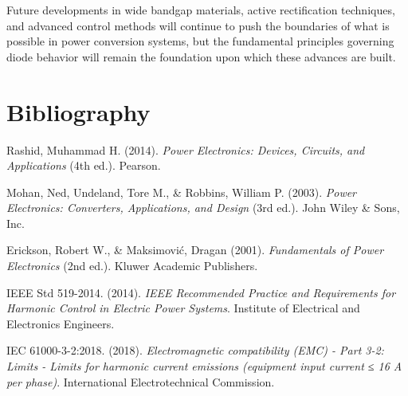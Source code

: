 \documentclass[12pt,a4paper]{article}
\begin{document}
Future developments in wide bandgap materials, active rectification techniques, and advanced control methods will continue to push the boundaries of what is possible in power conversion systems, but the fundamental principles governing diode behavior will remain the foundation upon which these advances are built.

\newpage
\section*{Bibliography}

\begin{thebibliography}{9}

Rashid, Muhammad H. (2014). \textit{Power Electronics: Devices, Circuits, and Applications} (4th ed.). Pearson.

Mohan, Ned, Undeland, Tore M., \& Robbins, William P. (2003). \textit{Power Electronics: Converters, Applications, and Design} (3rd ed.). John Wiley \& Sons, Inc.

Erickson, Robert W., \& Maksimović, Dragan (2001). \textit{Fundamentals of Power Electronics} (2nd ed.). Kluwer Academic Publishers.

IEEE Std 519-2014. (2014). \textit{IEEE Recommended Practice and Requirements for Harmonic Control in Electric Power Systems}. Institute of Electrical and Electronics Engineers.

IEC 61000-3-2:2018. (2018). \textit{Electromagnetic compatibility (EMC) - Part 3-2: Limits - Limits for harmonic current emissions (equipment input current ≤ 16 A per phase)}. International Electrotechnical Commission.

\end{thebibliography}
\end{document}
